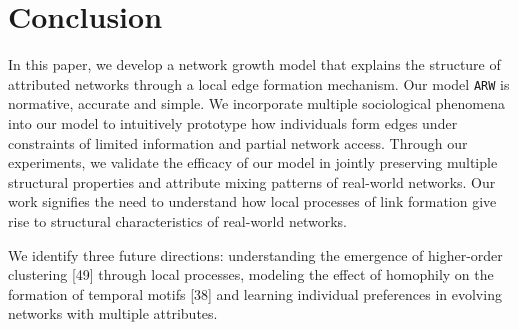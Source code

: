\section{Conclusion}
\label{sec:Conclusion}
In this paper, we develop a network growth model that explains the
structure of attributed networks through a local edge formation mechanism. Our
model \texttt{ARW} is normative, accurate and simple. We incorporate multiple
sociological phenomena into our model to intuitively prototype how individuals
form edges under constraints of limited information and partial network access.
Through our experiments, we validate the efficacy of our model in jointly preserving
multiple structural properties and attribute mixing patterns of real-world networks.
Our work signifies the need to understand how local processes of link formation
give rise to structural characteristics of real-world networks.


We identify three future directions: understanding the emergence of higher-order clustering [49]
through local processes, modeling the effect of homophily on the formation of temporal motifs [38]
and learning individual preferences in evolving networks with multiple attributes.

